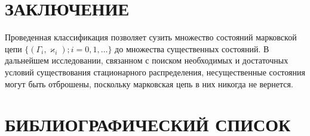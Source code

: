 \documentclass[12pt]{book}
\theoremstyle{plain}
\theoremstyle{remark}
\theoremstyle{plain}
\theoremstyle{definition}
\begin{document}
\section{ЗАКЛЮЧЕНИЕ}\label{Conclusion}
Проведенная классификация позволяет сузить множество состояний марковской цепи $\{(\Gamma_i,
\varkappa_{i}); i=0, 1,
\ldots\}$ до множества существенных состояний. В дальнейшем исследовании, связанном с поиском необходимых и достаточных условий существования стационарного распределения, несущественные состояния могут быть отброшены, поскольку марковская цепь в них никогда не вернется.



\section{БИБЛИОГРАФИЧЕСКИЙ СПИСОК}\label{Petr_sec3}
\end{document}
